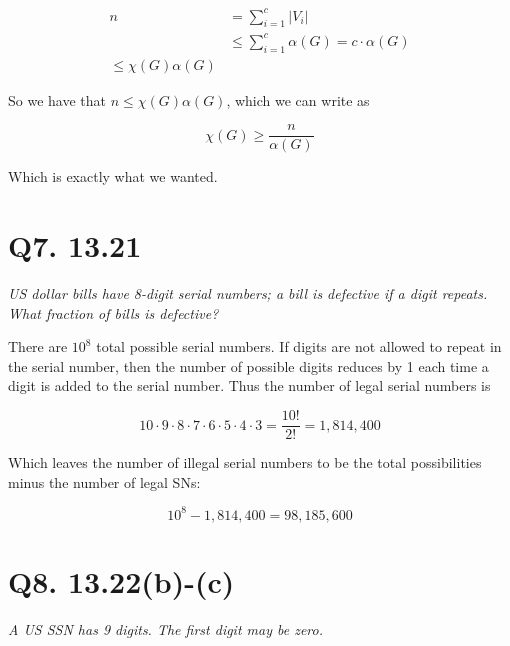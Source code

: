 \documentclass{article}
\begin{document}
\begin{align*}
  n &= \sum_{i=1}^{c} |V_i| \\
  &\leq \sum_{i=1}^{c} \alpha(G) = c\cdot\alpha(G) \\
  \leq \chi(G)\alpha(G)
\end{align*}

So we have that $n \leq \chi(G)\alpha(G)$, which we can write as 

$$\chi(G) \geq \frac{n}{\alpha(G)}$$

Which is exactly what we wanted.





\section*{Q7. 13.21}

\textit{US dollar bills have 8-digit serial numbers; a bill is defective if a digit repeats. What fraction of bills is defective?}

There are $10^8$ total possible serial numbers. If digits are not allowed to repeat in the serial number, then the number of possible digits reduces by 1 each time a digit is added to the serial number. Thus the number of legal serial numbers is 

  $$10\cdot9\cdot8\cdot7\cdot6\cdot5\cdot4\cdot3 = \frac{10!}{2!} = 1,814,400$$

  Which leaves the number of illegal serial numbers to be the total possibilities minus the number of legal SNs:

  $$10^8 - 1,814,400 = 98,185,600$$




\section*{Q8. 13.22(b)-(c)}

\textit{A US SSN has 9 digits. The first digit may be zero.}
\end{document}
